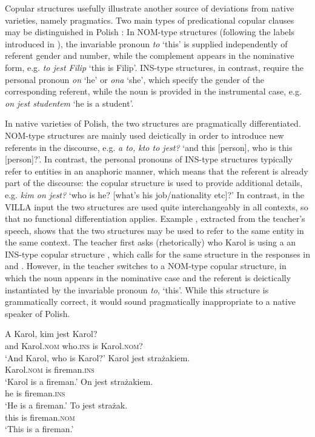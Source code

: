 Copular structures usefully illustrate another source of deviations from native varieties, namely pragmatics. Two main types of predicational copular clauses may be distinguished in Polish \citep{Bondaruk2013}: In NOM-type structures (following the labels introduced in \citealt{Saturno2015}), the invariable pronoun \textit{to} ‘this’ is supplied independently of referent gender and number, while the complement appears in the nominative form, e.g. \textit{to jest Filip} ‘this is Filip’. INS-type structures, in contrast, require the personal pronoun \textit{on} ‘he’ or \textit{ona} ‘she’, which specify the gender of the corresponding referent, while the noun is provided in the instrumental case, e.g. \textit{on jest studentem} ‘he is a student’.

In native varieties of Polish, the two structures are pragmatically differentiated. NOM-type structures are mainly used deictically in order to introduce new referents in the discourse, e.g. \textit{a to, kto to jest?} ‘and this [person], who is this [person]?’. In contrast, the personal pronouns of INS-type structures typically refer to entities in an anaphoric manner, which means that the referent is already part of the discourse: the copular structure is used to provide additional details, e.g. \textit{kim on jest?} ‘who is he? [what's his job/nationality etc]?’ In contrast, in the VILLA input the two structures are used quite interchangeably in all contexts, so that no functional differentiation applies. Example , extracted from the teacher's speech, shows that the two structures may be used to refer to the same entity in the same context. The teacher first asks (rhetorically) who Karol is using a an INS-type copular structure , which calls for the same structure in the responses in  and . However, in  the teacher switches to a NOM-type copular structure, in which the noun appears in the nominative case and the referent is deictically instantiated by the invariable pronoun \textit{to}, ‘this’. While this structure is grammatically correct, it would sound pragmatically inappropriate to a native speaker of Polish.

\ea%
    \label{ex:02:2}
    \ea\label{ex:02:2a}
    \gll    A Karol, kim jest Karol?\\
            and Karol.\textsc{nom} who.\textsc{ins} is Karol.\textsc{nom}?\\
    \glt    ‘And Karol, who is Karol?’
    \ex\label{ex:02:2b}
    \gll    Karol jest stra\.{z}akiem.\\
            Karol.\textsc{nom} is fireman.\textsc{ins}\\
    \glt    ‘Karol is a fireman.’
    \ex\label{ex:02:2c}
    \gll    On jest stra\.{z}akiem.\\
            he is fireman.\textsc{ins}\\
    \glt    ‘He is a fireman.’
    \ex\label{ex:02:2d}
    \gll    To jest stra\.{z}ak.\\
            this is fireman.\textsc{nom}\\
    \glt    ‘This is a fireman.’
    \z
\z

